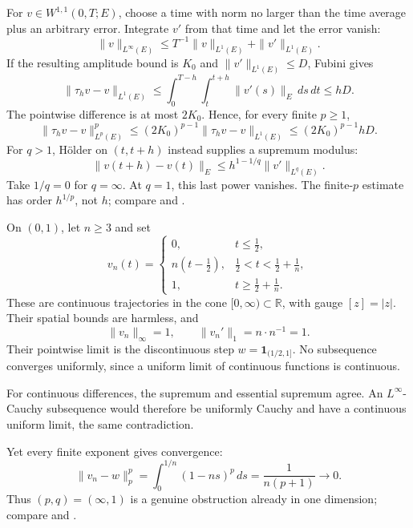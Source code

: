 \documentclass[12pt,reqno]{amsart}
\begin{document}
For $v\in W^{1,1}(0,T;E)$, choose a time with norm no larger than the time average plus an arbitrary error. Integrate $v'$ from that time and let the error vanish:
\begin{equation}\label{eq:w11}
\|v\|_{L^\infty(E)}\le T^{-1}\|v\|_{L^1(E)}+\|v'\|_{L^1(E)}.
\end{equation}
If the resulting amplitude bound is $K_0$ and $\|v'\|_{L^1(E)}\le D$, Fubini gives
\begin{equation}\label{eq:l1shift}
\|\tau_hv-v\|_{L^1(E)}
\le\int_0^{T-h}\int_t^{t+h}\|v'(s)\|_E\,ds\,dt\le hD.
\end{equation}
The pointwise difference is at most $2K_0$. Hence, for every finite $p\ge1$,
\begin{equation}\label{eq:pshift}
\|\tau_hv-v\|_{L^p(E)}^p
\le(2K_0)^{p-1}\|\tau_hv-v\|_{L^1(E)}
\le(2K_0)^{p-1}hD.
\end{equation}
For $q>1$, H\"older on $(t,t+h)$ instead supplies a supremum modulus:
\begin{equation}\label{eq:supshift}
\|v(t+h)-v(t)\|_E\le h^{1-1/q}\|v'\|_{L^q(E)}.
\end{equation}
Take $1/q=0$ for $q=\infty$. At $q=1$, this last power vanishes. The finite-$p$ estimate has order $h^{1/p}$, not $h$; compare \cite[Lemma 4, pp.~77--78]{S-simon} and \cite[Corollary 2.4, p.~1730]{S-maitre}.

On $(0,1)$, let $n\ge3$ and set
\[
v_n(t)=\begin{cases}
0,&t\le\tfrac12,\\
n(t-\tfrac12),&\tfrac12<t<\tfrac12+\tfrac1n,\\
1,&t\ge\tfrac12+\tfrac1n.
\end{cases}
\]
These are continuous trajectories in the cone $[0,\infty)\subset\mathbb R$, with gauge $[z]=|z|$. Their spatial bounds are harmless, and
\[
\|v_n\|_\infty=1,\qquad \|v_n'\|_1=n\cdot n^{-1}=1.
\]
Their pointwise limit is the discontinuous step $w=\mathbf1_{(1/2,1]}$. No subsequence converges uniformly, since a uniform limit of continuous functions is continuous.

For continuous differences, the supremum and essential supremum agree. An $L^\infty$-Cauchy subsequence would therefore be uniformly Cauchy and have a continuous uniform limit, the same contradiction.

Yet every finite exponent gives convergence:
\begin{equation}\label{eq:ramp}
\|v_n-w\|_p^p=\int_0^{1/n}(1-ns)^p\,ds
=\frac1{n(p+1)}\longrightarrow0.
\end{equation}
Thus $(p,q)=(\infty,1)$ is a genuine obstruction already in one dimension; compare \cite[Proposition 3, p.~94]{S-simon} and \cite[Remark 2, p.~4]{S-barrett-suli}.
\end{document}
